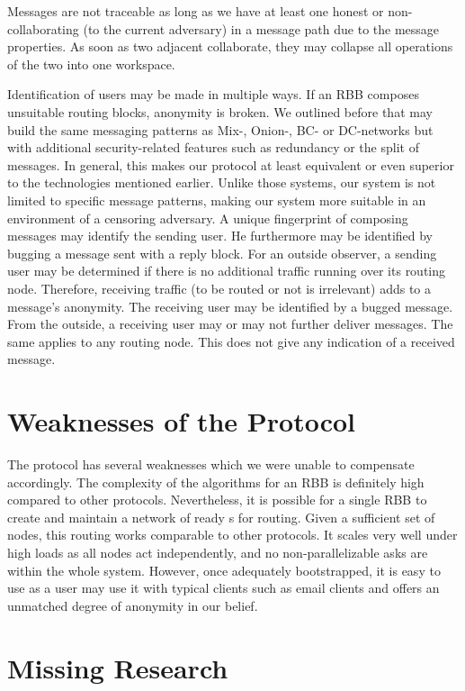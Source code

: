 Messages are not traceable as long as we have at least one honest or non-collaborating (to the current adversary) \VortexNode{} in a message path due to the message properties. As soon as two adjacent \VortexNodes{} collaborate, they may collapse all operations of the two into one workspace.

Identification of \MessageVortex{} users may be made in multiple ways. If an RBB composes unsuitable routing blocks, anonymity is broken. We outlined before that \MessageVortex{} may build the same messaging patterns as Mix-, Onion-, BC- or DC-networks but with additional security-related features such as redundancy or the split of messages. In general, this makes our protocol at least equivalent or even superior to the technologies mentioned earlier. Unlike those systems, our system is not limited to specific message patterns, making our system more suitable in an environment of a censoring adversary. A unique fingerprint of composing messages may identify the sending user. He furthermore may be identified by bugging a message sent with a reply block. For an outside observer, a sending user may be determined if there is no additional traffic running over its routing node. Therefore, receiving traffic (to be routed or not is irrelevant) adds to a message's anonymity. The receiving user may be identified by a bugged message. From the outside, a receiving user may or may not further deliver messages. The same applies to any routing node. This does not give any indication of a received message.

\chapter{Weaknesses of the Protocol}
The protocol has several weaknesses which we were unable to compensate accordingly. The complexity of the algorithms for an RBB is definitely high compared to other protocols. Nevertheless, it is possible for a single RBB to create and maintain a network of ready s for routing. Given a sufficient set of nodes, this routing works comparable to other protocols. It scales very well under high loads as all nodes act independently, and no non-parallelizable asks are within the whole system. However, once adequately bootstrapped, it is easy to use as a user may use it with typical clients such as email clients and offers an unmatched degree of anonymity in our belief.

\chapter{Missing Research}
